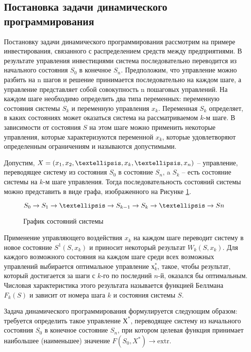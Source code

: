 \subsection{Постановка задачи динамического программирования}

Постановку задачи динамического программирования рассмотрим на примере инвестирования, связанного с распределением средств между предприятиями. В результате управления инвестициями система последовательно переводится из начального состояния $S_0$ в конечное $S_n$. Предположим, что управление можно разбить на n шагов и решение принимается последовательно на каждом шаге, а управление представляет собой совокупность n пошаговых управлений. На каждом шаге необходимо определить два типа переменных: переменную состояния системы $S_k$ и переменную управления $x_k$. Переменная $S_k$ определяет, в каких состояниях может оказаться система на рассматриваемом $k$-м шаге. В зависимости от состояния $S$ на этом шаге можно применить некоторые управления, которые характеризуются переменной $x_k$, которые удовлетворяют определенным ограничениям и называются допустимыми.

Допустим, $X = (x_1, x_2, \textellipsis, x_k, \textellipsis, x_n)$ – управление, переводящее систему из состояния $S_0$ в состояние $S_n$, a $S_k$ – есть состояние системы на $k$-м шаге управления. Тогда последовательность состояний системы можно представить в виде графа, изображенного на Рисунке \ref{sec:task:definition:system-state}.

\begin{figure}[h]
  \centering
    $S_0 \rightarrow S_1 \rightarrow \textellipsis \rightarrow S_{k-1} \rightarrow S_k \rightarrow \textellipsis \rightarrow Sn$
  \caption{График состояний системы}
  \label{sec:task:definition:system-state}
\end{figure}

Применение управляющего воздействия $x_k$ на каждом шаге переводит систему в новое состояние $S^1(S, x_k)$ и приносит некоторый результат $W_k (S, x_k)$. Для каждого возможного состояния на каждом шаге среди всех возможных управлений выбирается оптимальное управление $х^*_k$, такое, чтобы результат, который достигается за шаги с $k$-го по последний $n$-й, оказался бы оптимальным. Числовая характеристика этого результата называется функцией Беллмана $F_k(S)$ и зависит от номера шага $k$ и состояния системы $S$.

Задача динамического программирования формулируется следующим образом: требуется определить такое управление $Х^*$, переводящее систему из начального состояния $S_0$ в конечное состояние $S_n$, при котором целевая функция принимает наибольшее (наименьшее) значение $F(S_0, X^*) \rightarrow \text{extr}$.